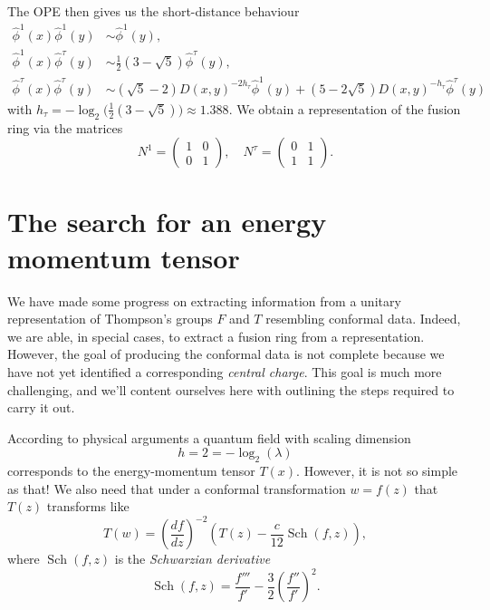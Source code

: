\documentclass[11pt,oneside]{amsart}
\DeclareMathOperator{\Sch}{Sch}
\theoremstyle{plain}%
\theoremstyle{definition}
\theoremstyle{remark}
\begin{document}
The OPE then gives us the short-distance behaviour
\begin{align}
	\hat{\phi}^1(x)\hat{\phi}^1(y) &\sim \hat{\phi}^1(y), \\
	\hat{\phi}^1(x)\hat{\phi}^\tau(y) &\sim \frac{1}{2}(3-\sqrt{5}) \hat{\phi}^\tau(y), \\
	\hat{\phi}^\tau(x)\hat{\phi}^\tau(y) &\sim (\sqrt{5}-2)D(x, y)^{-2h_\tau}	\hat{\phi}^1(y) + (5-2\sqrt{5})D(x, y)^{-h_\tau}\hat{\phi}^\tau(y)
\end{align}
with $h_\tau=-\log_2\bigl( \frac{1}{2}(3-\sqrt{5}) \bigr)\approx 1.388$.
We obtain a representation of the fusion ring via the matrices
\begin{equation}
	N^1=\begin{pmatrix}
		1 & 0\\
		0 & 1
	\end{pmatrix},\quad
	N^\tau=\begin{pmatrix}
		0 & 1\\
		1 & 1
	\end{pmatrix}.
\end{equation}


\section{The search for an energy momentum tensor}\label{sec:em}

We have made some progress on extracting information from a unitary representation of Thompson's groups $F$ and $T$ resembling  conformal data. Indeed, we are able, in special cases, to extract a fusion ring from a representation. However, the goal of producing the conformal data is not complete because we have not yet identified a corresponding \emph{central charge}. This goal is much more challenging, and we'll content ourselves here with outlining the steps required to carry it out.

According to physical arguments a quantum field with scaling dimension
\begin{equation}
	h = 2 = -\log_2(\lambda)
\end{equation}
corresponds to the energy-momentum tensor $T(x)$. However, it is not so simple as that! We also need that under a conformal transformation $w = f(z)$ that $T(z)$ transforms like
\begin{equation}\label{eq:energymomentumtx}
	T(w) = \left(\frac{df}{dz}\right)^{-2}\left(T(z)-\frac{c}{12}\Sch(f,z)\right),
\end{equation}
where $\Sch(f,z)$ is the \emph{Schwarzian derivative}
\begin{equation}
	\Sch(f,z) = \frac{f'''}{f'} - \frac{3}{2}\left(\frac{f''}{f'}\right)^2.
\end{equation}
\end{document}
